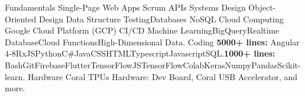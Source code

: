 \vspace{-3mm}
\begin{cvskills}
\vspace{1.5mm}\cvskill
    {Fundamentals}
    {Single-Page Web Apps \skilltypestyle{\textbf{|}} Scrum \skilltypestyle{\textbf{ |}} APIs \skilltypestyle{\textbf{ |}} Systems Design\skilltypestyle{\textbf{ |}} Object-Oriented Design \skilltypestyle{\textbf{|}} Data Structure \skilltypestyle{\textbf{ |}} Testing\skilltypestyle{\textbf{ |}}\newline Databases\skilltypestyle{\textbf{ |}} NoSQL\skilltypestyle{\textbf{ |}} Cloud Computing\skilltypestyle{\textbf{ |}} Google Cloud Platform (GCP)\skilltypestyle{\textbf{ |}} CI/CD\skilltypestyle{\textbf{ |}} Machine Learning\skilltypestyle{\textbf{ | }}BigQuery\skilltypestyle{\textbf{ | }}\newline Realtime Database\skilltypestyle{\textbf{ | }}Cloud Functions\skilltypestyle{\textbf{ | }}High-Dimensional Data.}
\vspace{1.5mm}\cvskill
     {Coding}
    {\textbf{5000+ lines:} Angular 4-8\skilltypestyle{\textbf{ | }}RxJS\skilltypestyle{\textbf{ | }}Python\skilltypestyle{\textbf{ | }}C\#\skilltypestyle{\textbf{ | }}Java\skilltypestyle{\textbf{ | }}CSS\skilltypestyle{\textbf{ | }}HTML\skilltypestyle{\textbf{ | }}Typescript\skilltypestyle{\textbf{ | }}Javascript\skilltypestyle{\textbf{ | }}SQL.\newline \textbf{1000+ lines:} Bash\skilltypestyle{\textbf{ | }}Git\skilltypestyle{\textbf{ | }}Firebase\skilltypestyle{\textbf{ | }}Flutter\skilltypestyle{\textbf{ | }}TensorFlowJS\skilltypestyle{\textbf{ | }}TensorFlow\skilltypestyle{\textbf{ | }}Colab\skilltypestyle{\textbf{ | }}Keras\skilltypestyle{\textbf{ | }}Numpy\skilltypestyle{\textbf{ | }}Pandas\skilltypestyle{\textbf{ | }}Scikit-learn.  }    
\cvskill
     {Hardware}
    {Coral TPUs Hardware: Dev Board, Coral USB Accelerator, and more.}      
\end{cvskills}
